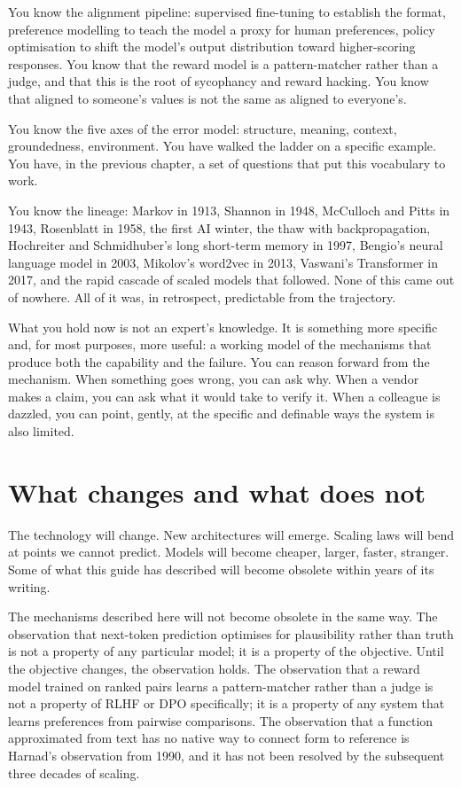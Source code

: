 You know the alignment pipeline: supervised fine-tuning to
establish the format, preference modelling to teach the
model a proxy for human preferences, policy optimisation to
shift the model's output distribution toward higher-scoring
responses. You know that the reward model is a
pattern-matcher rather than a judge, and that this is the
root of sycophancy and reward hacking. You know that
aligned to someone's values is not the same as aligned to
everyone's.

You know the five axes of the error model: structure,
meaning, context, groundedness, environment. You have walked
the ladder on a specific example. You have, in the previous
chapter, a set of questions that put this vocabulary to
work.

You know the lineage: Markov in 1913, Shannon in 1948,
McCulloch and Pitts in 1943, Rosenblatt in 1958, the first
AI winter, the thaw with backpropagation, Hochreiter and
Schmidhuber's long short-term memory in 1997, Bengio's
neural language model in 2003, Mikolov's word2vec in 2013,
Vaswani's Transformer in 2017, and the rapid cascade of
scaled models that followed. None of this came out of
nowhere. All of it was, in retrospect, predictable from
the trajectory.

What you hold now is not an expert's knowledge. It is
something more specific and, for most purposes, more useful:
a working model of the mechanisms that produce both the
capability and the failure. You can reason forward from
the mechanism. When something goes wrong, you can ask why.
When a vendor makes a claim, you can ask what it would
take to verify it. When a colleague is dazzled, you can
point, gently, at the specific and definable ways the
system is also limited.

\section*{What changes and what does not}

The technology will change. New architectures will emerge.
Scaling laws will bend at points we cannot predict. Models
will become cheaper, larger, faster, stranger. Some of
what this guide has described will become obsolete within
years of its writing.

The mechanisms described here will not become obsolete
in the same way. The observation that next-token prediction
optimises for plausibility rather than truth is not a
property of any particular model; it is a property of the
objective. Until the objective changes, the observation
holds. The observation that a reward model trained on
ranked pairs learns a pattern-matcher rather than a judge
is not a property of RLHF or DPO specifically; it is a
property of any system that learns preferences from
pairwise comparisons. The observation that a function
approximated from text has no native way to connect form
to reference is Harnad's observation from 1990, and it
has not been resolved by the subsequent three decades of
scaling.

